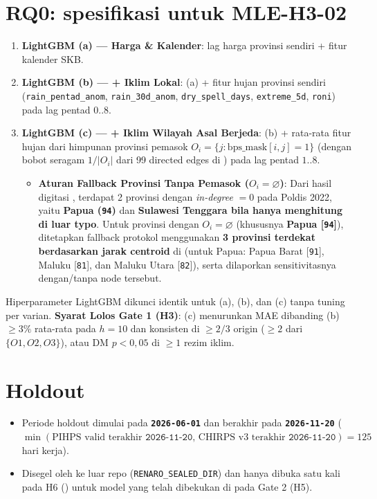 \documentclass[11pt,a4paper]{article}
\begin{document}
\section{RQ0: spesifikasi untuk MLE-H3-02}
\begin{enumerate}
  \item[(a)] \textbf{LightGBM (a) --- Harga \& Kalender}: lag harga provinsi sendiri + fitur kalender SKB.
  \item[(b)] \textbf{LightGBM (b) --- + Iklim Lokal}: (a) + fitur hujan provinsi sendiri (\texttt{rain\_pentad\_anom}, \texttt{rain\_30d\_anom}, \texttt{dry\_spell\_days}, \texttt{extreme\_5d}, \texttt{roni}) pada lag pentad $0..8$.
  \item[(c)] \textbf{LightGBM (c) --- + Iklim Wilayah Asal Berjeda}: (b) + rata-rata fitur hujan dari himpunan provinsi pemasok $O_i = \{j : \text{bps\_mask}[i, j] = 1\}$ (dengan bobot seragam $1/|O_i|$ dari 99 directed edges di ) pada lag pentad $1..8$.
        \begin{itemize}
          \item \textbf{Aturan Fallback Provinsi Tanpa Pemasok ($O_i = \varnothing$)}: Dari hasil digitasi , terdapat 2 provinsi dengan \emph{in-degree} $= 0$ pada Poldis 2022, yaitu \textbf{Papua (\texttt{94})} dan \textbf{Sulawesi Tenggara bila hanya menghitung di luar typo}. Untuk provinsi dengan $O_i = \varnothing$ (khususnya \textbf{Papua [\texttt{94}]}), ditetapkan fallback protokol menggunakan \textbf{3 provinsi terdekat berdasarkan jarak centroid} di  (untuk Papua: Papua Barat [\texttt{91}], Maluku [\texttt{81}], dan Maluku Utara [\texttt{82}]), serta dilaporkan sensitivitasnya dengan/tanpa node tersebut.
        \end{itemize}
\end{enumerate}
Hiperparameter LightGBM dikunci identik untuk (a), (b), dan (c) tanpa tuning per varian. \textbf{Syarat Lolos Gate 1 (H3)}: (c) menurunkan MAE dibanding (b) $\ge 3\%$ rata-rata pada $h=10$ dan konsisten di $\ge 2/3$ origin ($\ge 2$ dari $\{O1, O2, O3\}$), atau DM $p < 0{,}05$ di $\ge 1$ rezim iklim.

\section{Holdout}
\begin{itemize}
  \item Periode holdout dimulai pada \textbf{\texttt{2026-06-01}} dan berakhir pada \textbf{\texttt{2026-11-20}} ($\min(\text{PIHPS valid terakhir } \texttt{2026-11-20},\, \text{CHIRPS v3 terakhir } \texttt{2026-11-20}) = 125$ hari kerja).
  \item Disegel oleh  ke luar repo (\texttt{RENARO\_SEALED\_DIR}) dan hanya dibuka satu kali pada H6 () untuk model yang telah dibekukan di  pada Gate 2 (H5).
\end{itemize}
\end{document}
